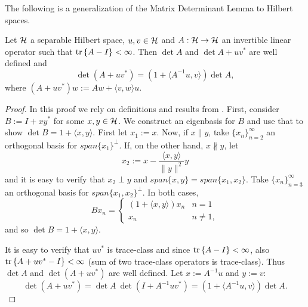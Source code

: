 \documentclass[review,supplement,hidelinks,onefignum,onetabnum]{siamart220329}
\begin{document}
The following is a generalization of the Matrix Determinant Lemma to
Hilbert spaces.
\begin{lemma}%
  Let $\mathcal{H}$ a separable Hilbert space, $u,v\in \mathcal{H}$ and $A: \mathcal{H} \to
  \mathcal{H}$ an invertible linear operator such that $\textup{tr}\left \{A-I \right \} <
  \infty$. Then $\det A$ and $\det A + uv^*$ are well defined and
  \begin{equation*}
    \det (A + uv^*) = (1 + \langle A^{-1} u, v \rangle ) \det A,
  \end{equation*}
  where $(A + uv^*)w := Aw + \langle v,w \rangle u$.
\end{lemma}
\begin{proof}
  In this proof we rely on definitions and results from
  \cite{simon1977}. First, consider $B := I + xy^*$ for some $x,y \in
  \mathcal{H}$. We construct an eigenbasis for $B$ and use that to show $\det
  B = 1 + \langle x, y \rangle$. First let $x_1 := x$.  Now, if $x
  \parallel y$, take $\{x_n \}_{n=2}^{\infty}$ an orthogonal basis for
  $span\{x_1\} ^{\perp}$. If, on the other hand, $x \not \parallel y$, let
  \begin{equation*}
    x_2 := x - \frac{ \langle x, y\rangle}{\|y\|^2}y
  \end{equation*}
  and it is easy to verify that $x_2 \perp y$ and $span \{x,y\} = span
  \{x_1,x_2\}$. Take $\{x_n \}_{n=3}^{\infty}$ an orthogonal basis for
  $span\{x_1,x_2\} ^{\perp}$. In both cases,
  \begin{equation*}
    B x_n =
    \begin{cases}
      (1 + \langle x, y \rangle) x_n & n = 1 \\
      x_n                            & n \neq 1,
    \end{cases}
  \end{equation*}
  and so $\det B = 1 + \langle x, y \rangle$.
  
  It is easy to verify that $uv^*$ is trace-class and since $\textup{tr}\left \{A-I \right \}
  < \infty$, also $\textup{tr}\left \{A + uv^* - I \right \} < \infty$ (sum of two trace-class
  operators is trace-class). Thus $\det A$ and $\det (A+uv^*)$ are
  well defined. Let $x:=A^{-1}u$ and $y := v$:
  \begin{equation*}
    \det (A + uv^*) = \det A \ \det(I+A^{-1}uv^*) =
    (1 + \langle A^{-1}u, v \rangle) \det A .
  \end{equation*}
\end{proof}


%


\end{document}
